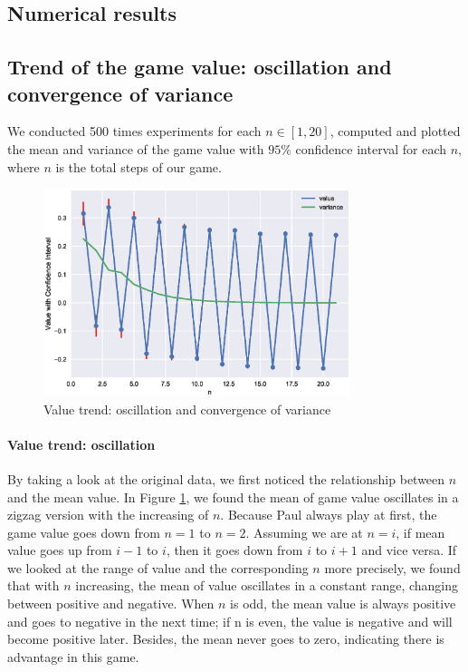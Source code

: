 \documentclass[a4paper,english]{article}
\begin{document}
\begin{spacing}{1.4}
\section{Numerical results}
\subsection{Trend of the game value: oscillation and convergence of variance}
We conducted 500 times experiments for each $n \in [1,20]$, computed and plotted the mean and variance of the game value with $95\%$ confidence interval for each $n$, where $n$ is the total steps of our game.

\begin{figure}[!htb]
\centering
\includegraphics[width=0.8\textwidth]{figures/plot1.eps}
\caption{Value trend: oscillation and convergence of variance}
\label{oscillate}
\end{figure}

\paragraph{Value trend: oscillation}
By taking a look at the original data, we first noticed the relationship between $n$ and the mean value. In Figure \ref{oscillate}, we found the mean of game value oscillates in a zigzag version with the increasing of $n$. Because Paul always play at first, the game value goes down from $n=1$ to $n=2$. Assuming we are at $n=i$, if mean value goes up from $i-1$ to $i$, then it goes down from $i$ to $i+1$ and vice versa. If we looked at the range of value and the corresponding $n$ more precisely, we found that with $n$ increasing, the mean of value oscillates in a constant range, changing between positive and negative. When $n$ is odd, the mean value is always positive and goes to negative in the next time; if n is even, the value is negative and will become positive later. Besides, the mean never goes to zero, indicating there is advantage in this game.

\end{spacing}
\end{document}
